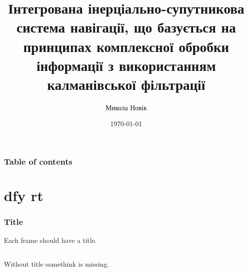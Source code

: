 \documentclass{beamer}
\begin{document}
\title{Інтегрована інерціально-супутникова система навігації, що базується на принципах комплексної обробки інформації
з використанням калманівської фільтрації}  
\author{Микола Новік}
\date{\today} 

\begin{frame}
\titlepage
\end{frame}

\begin{frame}\frametitle{Table of contents}\tableofcontents
\end{frame} 


\section{dfy rt} 
\begin{frame}\frametitle{Title} 
Each frame should have a title.
\end{frame}
\subsection{}
\begin{frame} 
Without title somethink is missing. 
\end{frame}
\end{document}
